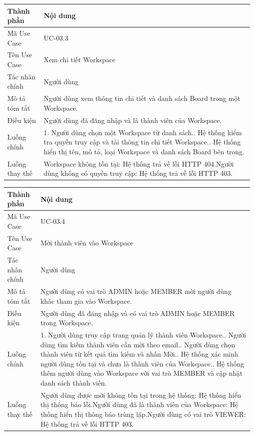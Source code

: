 \vspace{0.5cm}
\noindent\begin{tabular}{|p{3.5cm}|p{10.5cm}|}
\hline
\textbf{Thành phần} & \textbf{Nội dung} \\
\hline
Mã Use Case & UC-03.3 \\
\hline
Tên Use Case & Xem chi tiết Workspace \\
\hline
Tác nhân chính & Người dùng \\
\hline
Mô tả tóm tắt & Người dùng xem thông tin chi tiết và danh sách Board trong một Workspace. \\
\hline
Điều kiện & Người dùng đã đăng nhập và là thành viên của Workspace. \\
\hline
Luồng chính & 1. Người dùng chọn một Workspace từ danh sách.\newline 2. Hệ thống kiểm tra quyền truy cập và tải thông tin chi tiết Workspace.\newline 3. Hệ thống hiển thị tên, mô tả, loại Workspace và danh sách Board bên trong. \\
\hline
Luồng thay thế & Workspace không tồn tại: Hệ thống trả về lỗi HTTP 404.\newline Người dùng không có quyền truy cập: Hệ thống trả về lỗi HTTP 403. \\
\hline
\end{tabular}

\vspace{0.5cm}
\noindent\begin{tabular}{|p{3.5cm}|p{10.5cm}|}
\hline
\textbf{Thành phần} & \textbf{Nội dung} \\
\hline
Mã Use Case & UC-03.4 \\
\hline
Tên Use Case & Mời thành viên vào Workspace \\
\hline
Tác nhân chính & Người dùng \\
\hline
Mô tả tóm tắt & Người dùng có vai trò ADMIN hoặc MEMBER mời người dùng khác tham gia vào Workspace. \\
\hline
Điều kiện & Người dùng đã đăng nhập và có vai trò ADMIN hoặc MEMBER trong Workspace. \\
\hline
Luồng chính & 1. Người dùng truy cập trang quản lý thành viên Workspace.\newline 2. Người dùng tìm kiếm thành viên cần mời theo email.\newline 3. Người dùng chọn thành viên từ kết quả tìm kiếm và nhấn Mời.\newline 4. Hệ thống xác minh người dùng tồn tại và chưa là thành viên của Workspace.\newline 5. Hệ thống thêm người dùng vào Workspace với vai trò MEMBER và cập nhật danh sách thành viên. \\
\hline
Luồng thay thế & Người dùng được mời không tồn tại trong hệ thống: Hệ thống hiển thị thông báo lỗi.\newline Người dùng đã là thành viên của Workspace: Hệ thống hiển thị thông báo trùng lặp.\newline Người dùng có vai trò VIEWER: Hệ thống trả về lỗi HTTP 403. \\
\hline
\end{tabular}

